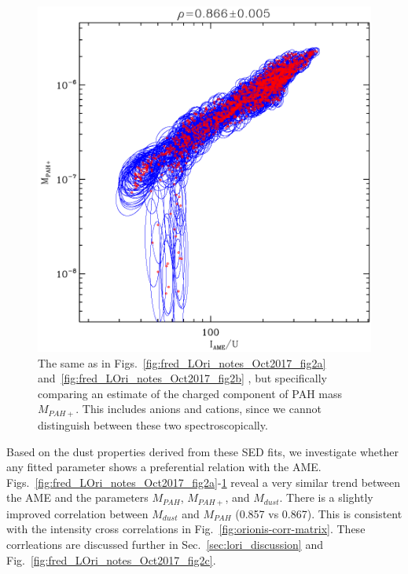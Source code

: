               \begin{figure}
                \includegraphics[width=\textwidth]{../Plots/ch_lori/fred_LOri_notes_Oct2017_fig2d.pdf}
                \centering
                \caption{ The same as in Figs.~\ref{fig:fred_LOri_notes_Oct2017_fig2a} and~\ref{fig:fred_LOri_notes_Oct2017_fig2b} , but specifically comparing an estimate of the charged component of PAH mass $M_{PAH+}$. This includes anions and cations, since we cannot distinguish between these two spectroscopically.}
                \label{fig:fred_LOri_notes_Oct2017_fig2d}
              \end{figure}
    Based on the dust properties derived from these SED fits, we investigate whether any fitted parameter shows a preferential relation with the AME. Figs.~\ref{fig:fred_LOri_notes_Oct2017_fig2a}-\ref{fig:fred_LOri_notes_Oct2017_fig2d} reveal a very similar trend between the AME and the parameters $M_{PAH}$, $M_{PAH+}$, and $M_{dust}$. There is a slightly improved correlation between $M_{dust}$ and $M_{PAH}$ (0.857 vs 0.867). This is consistent with the intensity cross correlations in Fig.~\ref{fig:orionis-corr-matrix}. These corrleations are discussed further in Sec.~\ref{sec:lori_discussion} and Fig.~\ref{fig:fred_LOri_notes_Oct2017_fig2c}.

